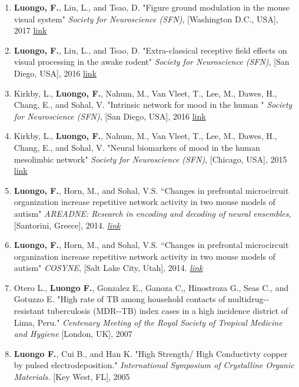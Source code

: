 \documentclass[10pt]{article}
\makeatletter
\newlength{\bibhang}
\newlength{\bibsep}
 {\@listi \global\bibsep\itemsep \global\advance\bibsep by\parsep}
\newenvironment{bibsection}%
        {\begin{enumerate}{}{%
       \setlength{\leftmargin}{\bibhang}%
       \setlength{\itemindent}{-\leftmargin}%
       \setlength{\itemsep}{\bibsep}%
       \setlength{\parsep}{\z@}%
        \setlength{\partopsep}{0pt}%
        \setlength{\topsep}{0pt}}}
        {\end{enumerate}\vspace{-.6\baselineskip}}
\makeatother
\begin{document}
\begin{bibsection}
	
	\item  {\bf Luongo, F.}, Liu, L., and Tsao, D. "Figure ground modulation in the mouse visual system"
	\emph{Society for Neuroscience (SFN)}, [Washington D.C., USA], 2017
	\href{http://www.abstractsonline.com/pp8/#!/4376/presentation/2784}{link}

	\item  {\bf Luongo, F.}, Liu, L., and Tsao, D. "Extra-classical receptive field effects on visual processing in the awake rodent"
	\emph{Society for Neuroscience (SFN)}, [San Diego, USA], 2016
	\href{http://www.abstractsonline.com/pp8/#!/4071/presentation/5606}{link}
	
	\item  Kirkby, L., {\bf Luongo, F.}, Nahum, M., Van Vleet, T., Lee, M., Dawes, H., Chang, E., and Sohal, V. "Intrinsic network for mood in the human "
	\emph{Society for Neuroscience (SFN)}, [San Diego, USA], 2016
	\href{http://www.abstractsonline.com/pp8/#!/4071/presentation/23755}{link}
	
	\item  Kirkby, L., {\bf Luongo, F.}, Nahum, M., Van Vleet, T., Lee, M., Dawes, H., Chang, E., and Sohal, V. "Neural biomarkers of mood in the human mesolimbic network"
	\emph{Society for Neuroscience (SFN)}, [Chicago, USA], 2015
	\href{http://www.abstractsonline.com/Plan/ViewAbstract.aspx?sKey=ad15aa3e-454c-4a82-9478-bdebae8afedb&cKey=19106932-8d59-4e58-a8ac-4e646186d307&mKey=d0ff4555-8574-4fbb-b9d4-04eec8ba0c84}{link}

	\item {\bf Luongo, F.}, Horn, M., and Sohal, V.S.  ``Changes in prefrontal microcircuit organization increase repetitive network activity in two mouse models of autism"  
	\emph{AREADNE: Research in encoding and decoding of neural ensembles}, [Santorini, Greece], 2014. \href{http://areadne.org/2014/hatsopoulos-pezaris-2014-areadne.pdf}{\em link}
	
	\item {\bf Luongo, F.}, Horn, M., and Sohal, V.S.  ``Changes in prefrontal microcircuit organization increase repetitive network activity in two mouse models of autism"  
	\emph{COSYNE}, [Salt Lake City, Utah], 2014. \href{http://cosyne.org/cosyne14/Cosyne2014_program_book.pdf}{\em{link}}
	
	\item Otero L., {\bf Luongo F.}, Gonzalez E., Ganoza C,, Hinostroza G., Seas C., and Gotuzzo E. "High rate of TB among household contacts of multidrug-­‐resistant tuberculosis (MDR-­‐TB) index cases in a high incidence district of Lima, Peru." 
	\emph{Centenary Meeting of the Royal Society of Tropical Medicine and Hygiene}  [London, UK], 2007
	
	\item {\bf Luongo F.}, Cui B., and Han  K. "High Strength/ High Conductivty copper by pulsed electrodeposition." 
	\emph{International Symposium of Crystalline Organic Materials.} [Key West, FL], 2005 
	
\end{bibsection}
\end{document}
